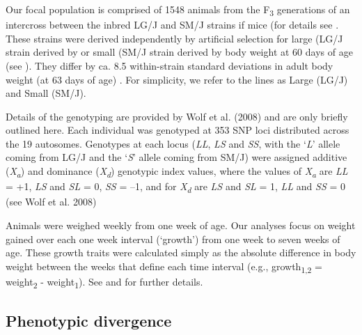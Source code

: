 \begin{refsection}
Our focal population is comprised of 1548 animals from the
F\textsubscript{3} generations of an intercross between the inbred LG/J
and SM/J strains if mice (for details see \textcite{Cheverud1996-fm,Wolf2008-cq}.
These strains were derived independently by
artificial selection for large (LG/J strain derived by \textcite{Goodale1938-an} or small
(SM/J strain derived by \textcite{MacArthur1944-ew} body weight
at 60 days of age (see  \textcite{Chai1956-fy}).
They differ by ca. 8.5 within-strain standard deviations in
adult body weight (at 63 days of age) \parencite{Kramer1998-cc}. For
simplicity, we refer to the lines as Large (LG/J) and Small (SM/J).

Details of the genotyping are provided by Wolf et al. (2008) and are
only briefly outlined here. Each individual was genotyped at 353 SNP
loci distributed across the 19 autosomes. Genotypes at each locus
(\emph{LL}, \emph{LS} and \emph{SS}, with the `\emph{L}' allele coming
from LG/J and the `\emph{S}' allele coming from SM/J) were assigned
additive (\emph{X\textsubscript{a}}) and dominance
(\emph{X\textsubscript{d}}) genotypic index values, where the values of
\emph{X\textsubscript{a}} are \emph{LL} = +1, \emph{LS} and \emph{SL} =
0, \emph{SS} = --1, and for \emph{X\textsubscript{d}} are \emph{LS} and
\emph{SL} = 1, \emph{LL} and \emph{SS} = 0 (see Wolf et al. 2008)

Animals were weighed weekly from one week of age. Our analyses focus on
weight gained over each one week interval (`growth') from one week to
seven weeks of age. These growth traits were calculated simply as the
absolute difference in body weight between the weeks that define each
time interval (e.g., growth\textsubscript{1,2} = weight\textsubscript{2}
- weight\textsubscript{1}). See \textcite{Vaughn1999-wt} and \textcite{Hager2009-mz}
 for further details.

\subsection{Phenotypic divergence}


\end{refsection}
